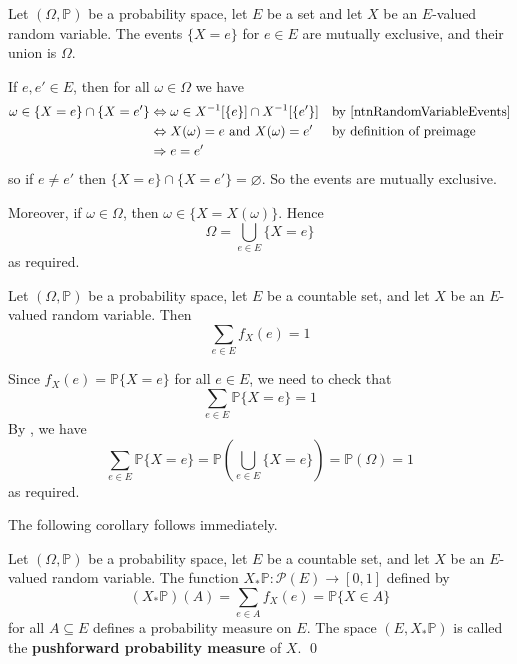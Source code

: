 \begin{lemma}
\label{lemRVEventsAreMutuallyExclusive}
Let $(\Omega,\mathbb{P})$ be a probability space, let $E$ be a set and let $X$ be an $E$-valued random variable. The events $\{ X=e \}$ for $e \in E$ are mutually exclusive, and their union is $\Omega$.
\end{lemma}
\begin{cproof}
If $e,e' \in E$, then for all $\omega \in \Omega$ we have
\begin{align*}
\omega \in \{ X=e \} \cap \{ X=e' \} &\Leftrightarrow \omega \in X^{-1}[\{e\}] \cap X^{-1}[\{e'\}] && \text{by \Cref{ntnRandomVariableEvents}} \\
&\Leftrightarrow X(\omega)=e \text{ and } X(\omega) = e' && \text{by definition of preimage} \\
&\Rightarrow e=e' &&
\end{align*}
so if $e \ne e'$ then $\{ X=e \} \cap \{ X=e' \} = \varnothing$. So the events are mutually exclusive.

Moreover, if $\omega \in \Omega$, then $\omega \in \{ X = X(\omega) \}$. Hence
\[ \Omega = \bigcup_{e \in E} \{ X=e \} \]
as required.
\end{cproof}

\begin{theorem}
\label{thmPMFSumsTo1}
Let $(\Omega,\mathbb{P})$ be a probability space, let $E$ be a countable set, and let $X$ be an $E$-valued random variable. Then
\[ \sum_{e \in E} f_X(e) = 1 \]
\end{theorem}

\begin{cproof}
Since $f_X(e) = \mathbb{P}\{X=e\}$ for all $e \in E$, we need to check that
\[ \sum_{e \in E} \mathbb{P}\{X=e\} = 1 \]
By , we have
\[ \sum_{e \in E} \mathbb{P}\{ X = e \} = \mathbb{P}\left( \bigcup_{e \in E} \{ X = e \} \right) = \mathbb{P}(\Omega) = 1 \]
as required.
\end{cproof}

The following corollary follows immediately.

\begin{corollary}
\label{corPushforwardMeasure}
Let $(\Omega,\mathbb{P})$ be a probability space, let $E$ be a countable set, and let $X$ be an $E$-valued random variable. The function $X_*\mathbb{P} : \mathcal{P}(E) \to [0,1]$ defined by
\[ (X_*\mathbb{P})(A) = \sum_{e \in A} f_X(e) = \mathbb{P}\{X \in A\} \]
for all $A \subseteq E$ defines a probability measure on $E$. The space $(E,X_*\mathbb{P})$ is called the \textbf{pushforward probability measure} of $X$. \qed
\end{corollary}

